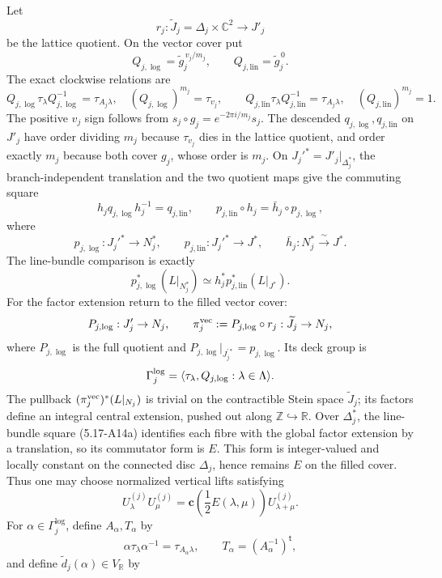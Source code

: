 {\ResultSmall
Let
\[
 r_j:\widetilde J_j=\Delta_j\times\mathbb C^2\longrightarrow J'_j
\]
be the lattice quotient.  On the vector cover put
\[
 Q_{j,\log}=\widetilde g_j^{\,v_j/m_j},\qquad
 Q_{j,\mathrm{lin}}=\widetilde g_j^{\,0}.
\]
The exact clockwise relations are
\[
 Q_{j,\log}\tau_\lambda Q_{j,\log}^{-1}=\tau_{A_j\lambda},
 \quad (Q_{j,\log})^{m_j}=\tau_{v_j},\qquad
 Q_{j,\mathrm{lin}}\tau_\lambda Q_{j,\mathrm{lin}}^{-1}=\tau_{A_j\lambda},
 \quad (Q_{j,\mathrm{lin}})^{m_j}=1.
\]
The positive \(v_j\) sign follows from
\(s_j\circ g_j=e^{-2\pi i/m_j}s_j\).  The descended
\(q_{j,\log},q_{j,\mathrm{lin}}\) on \(J'_j\) have order dividing \(m_j\)
because \(\tau_{v_j}\) dies in the lattice quotient, and order exactly
\(m_j\) because both cover \(g_j\), whose order is \(m_j\).
On \(J_j'^*=J'_j|_{\Delta_j^*}\), the branch-independent translation and
the two quotient maps give the commuting square
\[
 h_jq_{j,\log}h_j^{-1}=q_{j,\mathrm{lin}},\qquad
 p_{j,\mathrm{lin}}\circ h_j=\bar h_j\circ p_{j,\log},
\]
where
\[
 p_{j,\log}:J_j'^*\to N_j^*,\qquad
 p_{j,\mathrm{lin}}:J_j'^*\to J^*,\qquad
 \bar h_j:N_j^*\xrightarrow{\ \sim\ }J^*.
\]
The line-bundle comparison is exactly
\[
 p_{j,\log}^*(L|_{N_j^*})
 \simeq h_j^*p_{j,\mathrm{lin}}^*(L|_{J^*}).
\tag{5.17-A14a}
\]
For the factor extension return to the filled vector cover:
\[
 P_{j,\log}:J'_j\to N_j,\qquad
 \pi_j^{\rm vec}:=P_{j,\log}\circ r_j:\widetilde J_j\to N_j,
\]
where \(P_{j,\log}\) is the full quotient and
\(P_{j,\log}|_{J_j^{\prime *}}=p_{j,\log}\).  Its deck group is
\[
 \Gamma_j^{\rm log}
 =\langle\tau_\lambda,Q_{j,\log}:\lambda\in\Lambda\rangle.
\]
The pullback \((\pi_j^{\rm vec})^*(L|_{N_j})\) is trivial on the
contractible Stein space \(\widetilde J_j\); its factors define an integral
central extension, pushed out along \(\mathbb Z\hookrightarrow\mathbb R\).
Over \(\Delta_j^*\), the line-bundle square \textup{(5.17-A14a)} identifies
each fibre with the global factor extension by a translation, so its
commutator form is \(E\).  This form is integer-valued and locally constant
on the connected disc \(\Delta_j\), hence remains \(E\) on the filled cover.
Thus one may choose normalized vertical lifts satisfying
\[
 U_\lambda^{(j)}U_\mu^{(j)}
 =\mathbf c\!\left(\frac12E(\lambda,\mu)\right)
  U_{\lambda+\mu}^{(j)}.
\]
For \(\alpha\in\Gamma_j^{\log}\), define \(A_\alpha,T_\alpha\) by
\[
 \alpha\tau_\lambda\alpha^{-1}=\tau_{A_\alpha\lambda},\qquad
 T_\alpha=(A_\alpha^{-1})^{\mathsf t},
\]
and define
\(\widetilde d_j(\alpha)\in V_{\mathbb R}\) by
}
